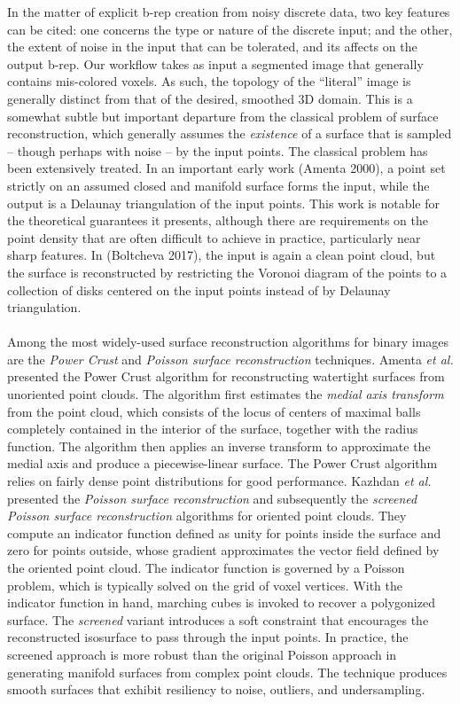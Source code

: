 In the matter of explicit b-rep creation from noisy discrete data, two key features can be cited:  one concerns the type or nature of the discrete input; and the other, the extent of noise in the input that can be tolerated, and its affects on the output b-rep.  Our workflow takes as input a segmented image that generally contains mis-colored voxels.  As such, the topology of the ``literal'' image is generally distinct from that of the desired, smoothed 3D domain.  This is a somewhat subtle but important departure from the classical problem of surface reconstruction, which generally assumes the {\em existence} of a surface that is sampled -- though perhaps with noise -- by the input points.  The classical problem has been extensively treated.  In an important early work (Amenta 2000), a point set strictly on an assumed closed and manifold surface forms the input, while the output is a Delaunay triangulation of the input points.  This work is notable for the theoretical guarantees it presents, although there are requirements on the point density that are often difficult to achieve in practice, particularly near sharp features.  In (Boltcheva 2017), the input is again a clean point cloud, but the surface is reconstructed by restricting the Voronoi diagram of the points to a collection of disks centered on the input points instead of by Delaunay triangulation. \\ \\
%
Among the most widely-used surface reconstruction algorithms for binary images are the \textit{Power Crust} and \textit{Poisson surface reconstruction} techniques. Amenta \textit{et al.} \cite{amenta_2001} presented the Power Crust algorithm for reconstructing watertight surfaces from unoriented point clouds. The algorithm first estimates the \textit{medial axis transform} from the point cloud, which consists of the locus of centers of maximal balls completely contained in the interior of the surface, together with the radius function. The algorithm then applies an inverse transform to approximate the medial axis and produce a piecewise-linear surface. The Power Crust algorithm relies on fairly dense point distributions for good performance.  Kazhdan \textit{et al.} presented the \textit{Poisson surface reconstruction} \cite{kazhdan_2008} and subsequently the \textit{screened Poisson surface reconstruction} \cite{kazhdan_2013} algorithms for oriented point clouds. They compute an indicator function defined as unity for points inside the surface and zero for points outside, whose gradient approximates the vector field defined by the oriented point cloud. The indicator function is governed by a Poisson problem, which is typically solved on the grid of voxel vertices.  With the indicator function in hand, marching cubes is invoked to recover a polygonized surface.  The \textit{screened} variant introduces a soft constraint that encourages the reconstructed isosurface to pass through the input points. In practice, the screened approach is more robust than the original Poisson approach in generating manifold surfaces from complex point clouds. The technique produces smooth surfaces that exhibit resiliency to noise, outliers, and undersampling. \\ \\
